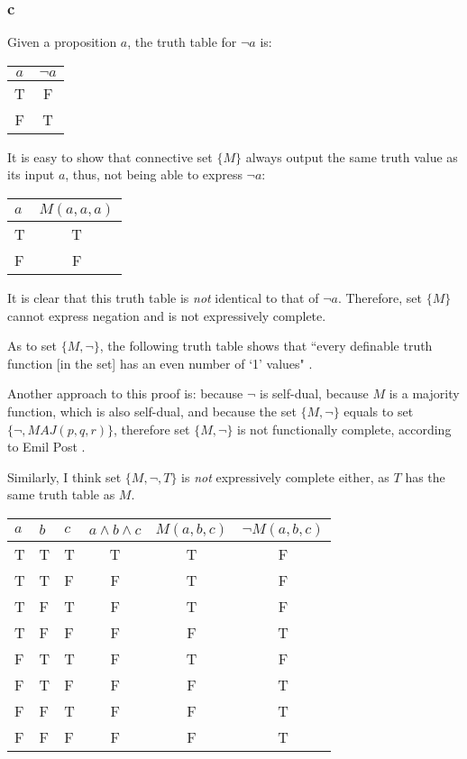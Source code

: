 \subsubsection{c}
Given a proposition \(a\), the truth table for \(\neg a\) is:
\begin{center}
\begin{tabular}{|c|c|}
  \hline
  \(a\) & \(\neg a\)  \\
  \hline
  T & F  \\
  F & T  \\
  \hline
\end{tabular}
\end{center}

It is easy to show that connective set \(\{M\}\) always output the same truth value as its input \(a\), thus, not being able to express \(\neg a\):
\begin{center}
\begin{tabular}{|l|c|}
  \hline
  \(a\) & \(M(a,a,a)\) \\
  \hline
  T & T  \\
  F & F  \\
  \hline
\end{tabular}
\end{center}
It is clear that this truth table is \emph{not} identical to that of \(\neg a\). Therefore, set \(\{M\}\) cannot express negation and is not expressively complete.


As to set \(\{M, \neg\}\), the following truth table shows that ``every definable truth function [in the set] has an even number of `1' values" \parencite{john2021}.


Another approach to this proof is: because \(\neg\) is self-dual, because \(M\) is a majority function, which is also self-dual, and because the set \(\{M, \neg\}\) equals to set \(\{\neg, MAJ(p,q,r)\}\), therefore set \(\{M, \neg\}\) is not functionally complete, according to Emil Post \parencites{wiki:fncomp}{wiki:majf}.


Similarly, I think set \(\{M, \neg, T\}\) is \emph{not} expressively complete either, as \(T\) has the same truth table as \(M\).

\begin{center}
\begin{tabular}{|l|l|l|c|c|c|}
  \hline
  \(a\) & \(b\) & \(c\) & \(a \land b \land c\) & \(M(a,b,c)\) & \(\neg M(a,b,c)\) \\
  \hline
  T & T & T & T & T & F \\
  T & T & F & F & T & F \\
  T & F & T & F & T & F \\
  T & F & F & F & F & T \\
  F & T & T & F & T & F \\
  F & T & F & F & F & T \\
  F & F & T & F & F & T \\
  F & F & F & F & F & T \\
  \hline
\end{tabular}
\end{center}
